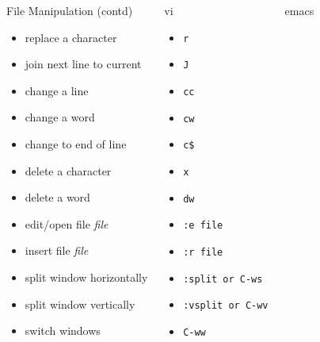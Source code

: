 \documentclass[10pt,t]{beamer}
\begin{document}
\begin{frame}[allowframebreaks]
{  }
  \framebreak
  {\scriptsize
  \begin{columns}
     \vspace{-0.5cm}
    \begin{exampleblock}{File Manipulation (contd)}
    \begin{itemize}
      \item replace a character
      \item join next line to current
      \item change a line
      \item change a word
      \item change to end of line
      \item delete a character
      \item delete a word
      \item edit/open file \textit{file}
      \item insert file \textit{file}
      \item split window horizontally
      \item split window vertically
      \item switch windows
    \end{itemize}
    \end{exampleblock}
     \vspace{-0.5cm}
    \begin{exampleblock}{vi}
    \begin{itemize}
      \item \texttt{r}
      \item \texttt{J}
      \item \texttt{cc}
      \item \texttt{cw}
      \item \texttt{c\$}
      \item \texttt{x}
      \item \texttt{dw}
      \item \texttt{:e \texttt{file}}
      \item \texttt{:r \texttt{file}}
      \item \texttt{:split or C-ws}
      \item \texttt{:vsplit or C-wv}
      \item \texttt{C-ww}
    \end{itemize}
    \end{exampleblock}
     \vspace{-0.5cm}
    \begin{exampleblock}{emacs}

\end{exampleblock}
\end{columns}}
\end{frame}
\end{document}
